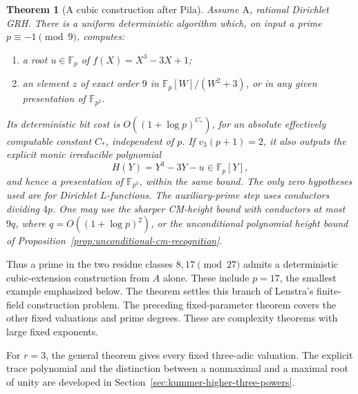 \documentclass[11pt]{article}
\newtheorem{theorem}{Theorem}[section]
\theoremstyle{definition}
\theoremstyle{remark}
\begin{document}
\begin{theorem}[A cubic construction after Pila]\label{thm:dirichlet-ninth-root-cubic}
Assume \(\mathrm A\), rational Dirichlet GRH. There is a uniform
deterministic algorithm which, on input a prime
\(p\equiv-1\pmod9\), computes:
\begin{enumerate}
\item a root \(u\in\mathbb F_p\) of
\(f(X)=X^3-3X+1\);
\item an element \(z\) of exact order \(9\) in
\(\mathbb F_p[W]/(W^2+3)\), or in any given presentation of
\(\mathbb F_{p^2}\).
\end{enumerate}
Its deterministic bit cost is \(O((1+\log p)^{C_*})\), for an
absolute effectively computable constant \(C_*\), independent of
\(p\). If \(v_3(p+1)=2\), it also outputs the explicit monic
irreducible polynomial
\[
                 H(Y)=Y^3-3Y-u\in\mathbb F_p[Y],
\]
and hence a presentation of \(\mathbb F_{p^3}\), within the same
bound. The only zero hypotheses used are for Dirichlet \(L\)-functions.
The auxiliary-prime step uses conductors dividing \(4p\). One may
use the sharper CM-height bound with conductors at most \(9q\),
where \(q=O((1+\log p)^2)\), or the unconditional polynomial
height bound of Proposition~\ref{prop:unconditional-cm-recognition}.
\end{theorem}

Thus a prime in the two residue classes \(8,17\pmod{27}\) admits a
deterministic cubic-extension construction from \(A\) alone. These
include \(p=17\), the smallest example emphasized below. The theorem
settles this branch of Lenstra's finite-field construction problem.
The preceding fixed-parameter theorem covers the other fixed
valuations and prime degrees. These are complexity theorems with
large fixed exponents.

For \(r=3\), the general theorem gives every fixed three-adic
valuation. The explicit trace polynomial and the distinction between
a nonmaximal and a maximal root of unity are developed in
Section~\ref{sec:kummer-higher-three-powers}.
\end{document}

